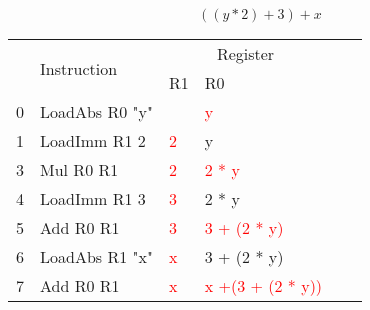 \documentclass{report}
\newcommand{\hot}[1]{\textcolor{red}{#1}}
\begin{document}
        
            \[((y * 2) + 3) + x\]
            \begin{center}
                \begin{tabular}{c l | l l l l}
                    & \multirow{2}{*}{Instruction} & \multicolumn{2}{c}{Register} \\
                    & & R1 & R0 \\
                    \hline
                    0 &LoadAbs R0 "y"&        & \hot{y}\\
                    1 &LoadImm R1 2  & \hot{2}& y\\
                    3 &Mul R0 R1     & \hot{2}& \hot{2 * y}\\
                    4 &LoadImm R1 3  & \hot{3}& 2 * y\\
                    5 &Add R0 R1     & \hot{3}& \hot{3 + (2 * y)}\\
                    6 &LoadAbs R1 "x"& \hot{x}& 3 + (2 * y)\\
                    7 &Add R0 R1     & \hot{x}& \hot{x +(3 + (2 * y))}\\
                \end{tabular}
            \end{center}
        
\end{document}
